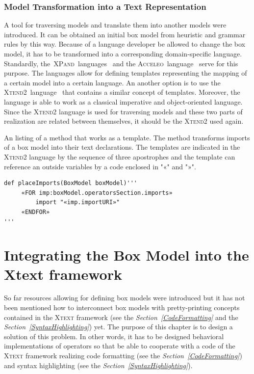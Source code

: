 \documentclass[12pt,notitlepage,a4paper]{report}
\begin{document}
\subsection{Model Transformation into a Text Representation}
\label{XpandModelTransformation}
A tool for traversing models and translate them into another models were introduced. It can be obtained an initial box model from heuristic and grammar rules by this way. Because of a language developer be allowed to change the box model, it has to be transformed into a corresponding domain-specific language. Standardly, the~\textsc{XPand}~languages~\cite{XPand} and the \textsc{Acceleo}~language~\cite{Acceleo} serve for this purpose. The languages allow for defining templates representing the mapping of a certain model into a certain language. An another option is to use the \textsc{Xtend2}~language~\cite{Xtend} that contains a similar concept of templates. Moreover, the language is able to work as a classical imperative and object-oriented language. Since the \textsc{Xtend2} language is used for traversing models and these two parts of realization are related between themselves, it should be the \textsc{Xtend2} used again.

\begin{expl}\label{HeuristicNonterms}
An listing of a method that works as a template. The method transforms imports of a box model into their text declarations. The templates are indicated in the \textsc{Xtend2} language by the sequence of three apostrophes and the template can reference an outside variables by a code enclosed in "«"  and "»".
\begingroup
\fontsize{10pt}{12pt}
\begin{Verbatim}[commandchars=\\\{\}]
def placeImports(BoxModel boxModel)'''
     «FOR imp:boxModel.operatorsSection.imports»
         import "«imp.importURI»"
     «ENDFOR»
'''

\end{Verbatim}
\endgroup
\end{expl}

\chapter {Integrating the Box Model into the Xtext framework}
So far resources allowing for defining box models were introduced but it has not been mentioned how to interconnect box models with pretty-printing concepts contained in the \textsc{Xtext} framework (see the \textit{Section~\ref{CodeFormatting}} and the \textit{Section~\ref{SyntaxHighlighting}}) yet. The purpose of this chapter is to design a solution of this problem. In other words, it has to be designed behavioral implementations of operators so that be able to cooperate with a code of the \textsc{Xtext} framework realizing code formatting (see the \textit{Section~\ref{CodeFormatting}}) and syntax highlighting (see the \textit{Section~\ref{SyntaxHighlighting}}). 
\end{document}
